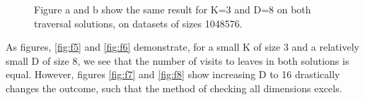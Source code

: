 

\begin{figure}[H]
  \centering
  \caption{Figure a and b show the same result for K=3 and D=8 on both traversal solutions, on datasets of sizes 1048576.}
  \label{fig:k3d8}
\end{figure}


As figures, \ref{fig:f5} and \ref{fig:f6}  demonstrate, for a small K of size 3 and a relatively small D of size 8, we see that the number of visits to leaves in both solutions is equal. However, figures \ref{fig:f7} and \ref{fig:f8}  show increasing D to 16 drastically changes the outcome, such that the method of checking all dimensions excels. 

